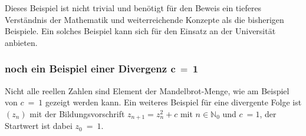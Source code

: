 \documentclass[a4paper, 12pt]{book}
\begin{document}
Dieses Beispiel ist nicht trivial und benötigt für den Beweis ein
tieferes Verständnis der Mathematik und weiterreichende Konzepte als die
bisherigen Beispiele. Ein solches Beispiel kann sich für den Einsatz an
der Universität anbieten.

\hypertarget{noch-ein-beispiel-einer-divergenz-mathbfc-1}{%
\subsubsection{\texorpdfstring{noch ein Beispiel einer Divergenz
\(\mathbf{c\  = \ 1}\)}{noch ein Beispiel einer Divergenz \textbackslash mathbf\{c\textbackslash{}  = \textbackslash{} 1\}}}\label{noch-ein-beispiel-einer-divergenz-mathbfc-1}}

Nicht alle reellen Zahlen sind Element der Mandelbrot-Menge, wie am
Beispiel von \(c\  = \ 1\) gezeigt werden kann. Ein weiteres Beispiel
für eine divergente Folge ist \(\left( z_{n} \right)\) mit der
Bildungsvorschrift \(z_{n + 1} = z_{n}^{2} + c\) mit
\(n \in \mathbb{N}_{0}\) und \(c\  = 1\), der Startwert ist dabei
\(z_{0}\  = \ 1\).
\end{document}
